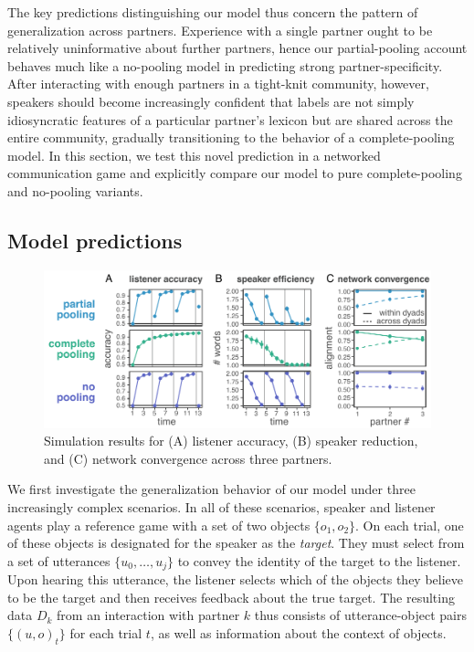 The key predictions distinguishing our model thus concern the pattern of generalization across partners.
Experience with a single partner ought to be relatively uninformative about further partners, hence our partial-pooling account behaves much like a no-pooling model in predicting strong partner-specificity.
After interacting with enough partners in a tight-knit community, however, speakers should become increasingly confident that labels are not simply idiosyncratic features of a particular partner's lexicon but are shared across the entire community, gradually transitioning to the behavior of a complete-pooling model.
In this section, we test this novel prediction in a networked communication game and explicitly compare our model to pure complete-pooling and no-pooling variants.

\subsection{Model predictions}

\begin{figure}
\includegraphics[scale=1.05]{./figures/sec3-model_results.pdf}
\caption{Simulation results for (A) listener accuracy, (B) speaker reduction, and (C) network convergence across three partners.}
\label{fig:model_results}
\end{figure}

We first investigate the generalization behavior of our model under three increasingly complex scenarios. 
In all of these scenarios, speaker and listener agents play a reference game with a set of two objects $\{o_1, o_2\}$.
On each trial, one of these objects is designated for the speaker as the \emph{target}. 
They must select from a set of utterances $\{u_0, \dots, u_j\}$ to convey the identity of the target to the listener.
Upon hearing this utterance, the listener selects which of the objects they believe to be the target and then receives feedback about the true target.
The resulting data $D_k$ from an interaction with partner $k$ thus consists of utterance-object pairs $\{(u, o)_t\}$ for each trial $t$, as well as information about the context of objects.

